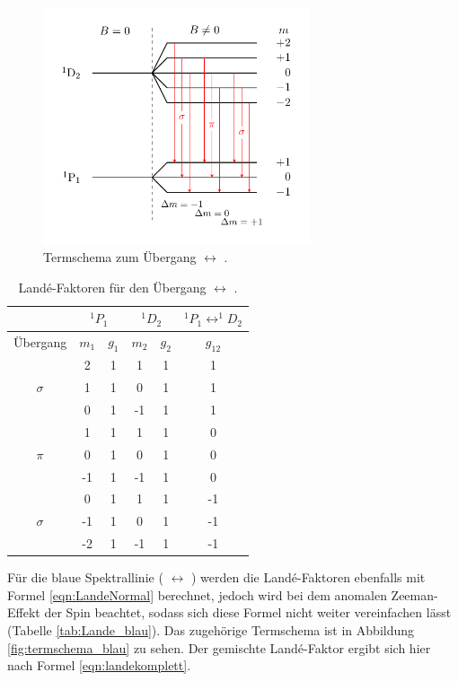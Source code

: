 \begin{figure}
  \centering
  \includegraphics[width=0.7\textwidth]{Pics/termschema_rot.pdf}
  \caption{Termschema zum Übergang  $\leftrightarrow$ 
          \cite{luckyjosh}.}
  \label{fig:TermschemaRot}
\end{figure}

\begin{table}
	\centering
  \caption{Landé-Faktoren für den Übergang  $\leftrightarrow$ .}
	\label{tab:LandeRot}
	\begin{tabular}{cccccc}
		\toprule
		{} & \multicolumn{2}{c}{${}^1P_1$}  & \multicolumn{2}{c}{${}^1D_2$}  & $^1P_1\leftrightarrow ^1\!\!D_2$ \\
		\midrule
		 Übergang &   $m_1$  & $g_{1}$ & $m_2$ & $ g_2$  & $g_{12}$  \\
		\midrule
		& 2 & 1 & 1 & 1 & 1\\
		$\sigma$& 1 & 1 & 0 & 1 & 1\\
		& 0 & 1 & -1 & 1 & 1\\
		\midrule
		& 1 & 1 & 1 & 1 & 0\\
		$\pi$ & 0 & 1 & 0 & 1 & 0\\
		& -1 & 1 & -1 & 1 & 0\\
		\midrule
		& 0 & 1 & 1 & 1 & -1\\
		$\sigma$ & -1 & 1 & 0 & 1 & -1\\
		& -2 & 1 & -1 & 1 & -1\\\bottomrule
	\end{tabular}
\end{table}

Für die blaue Spektrallinie ( $\leftrightarrow$ ) werden die
Landé-Faktoren ebenfalls mit Formel \eqref{eqn:LandeNormal} berechnet, jedoch wird
bei dem anomalen Zeeman-Effekt der Spin beachtet, sodass sich diese Formel nicht
weiter vereinfachen lässt (Tabelle \ref{tab:Lande_blau}). Das zugehörige Termschema
ist in Abbildung \ref{fig:termschema_blau} zu sehen. Der gemischte Landé-Faktor
ergibt sich hier nach Formel \eqref{eqn:landekomplett}.

